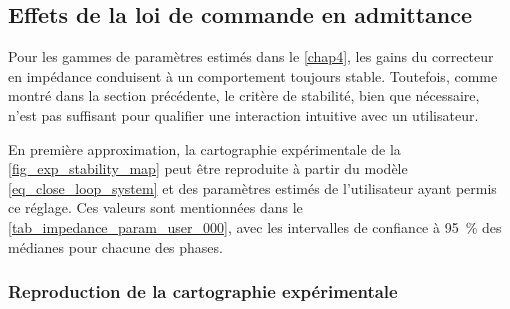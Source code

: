 
\subsection{Effets de la loi de commande en admittance}

Pour les gammes de paramètres estimés dans le \cref{chap4}, les gains du correcteur en impédance conduisent à un comportement toujours stable. Toutefois, comme montré dans la section précédente, le critère de stabilité, bien que nécessaire, n'est pas suffisant pour qualifier une interaction intuitive avec un utilisateur. %

En première approximation, la cartographie expérimentale de la \cref{fig_exp_stability_map} peut être reproduite à partir du modèle \cref{eq_close_loop_system} et des paramètres estimés de l'utilisateur ayant permis ce réglage. Ces valeurs sont mentionnées dans le \cref{tab_impedance_param_user_000}, avec les intervalles de confiance à \SI{95}{\percent} des médianes pour chacune des phases.

\subsubsection{Reproduction de la cartographie expérimentale}

